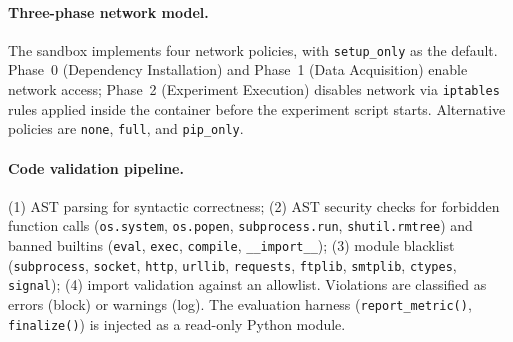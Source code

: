\paragraph{Three-phase network model.} The sandbox implements four network policies, with \texttt{setup\_only} as the default. Phase~0 (Dependency Installation) and Phase~1 (Data Acquisition) enable network access; Phase~2 (Experiment Execution) disables network via \texttt{iptables} rules applied inside the container before the experiment script starts. Alternative policies are \texttt{none}, \texttt{full}, and \texttt{pip\_only}.

\paragraph{Code validation pipeline.} (1) AST parsing for syntactic correctness; (2) AST security checks for forbidden function calls (\texttt{os.system}, \texttt{os.popen}, \texttt{subprocess.run}, \texttt{shutil.rmtree}) and banned builtins (\texttt{eval}, \texttt{exec}, \texttt{compile}, \texttt{\_\_import\_\_}); (3) module blacklist (\texttt{subprocess}, \texttt{socket}, \texttt{http}, \texttt{urllib}, \texttt{requests}, \texttt{ftplib}, \texttt{smtplib}, \texttt{ctypes}, \texttt{signal}); (4) import validation against an allowlist. Violations are classified as errors (block) or warnings (log). The evaluation harness (\texttt{report\_metric()}, \texttt{finalize()}) is injected as a read-only Python module.



